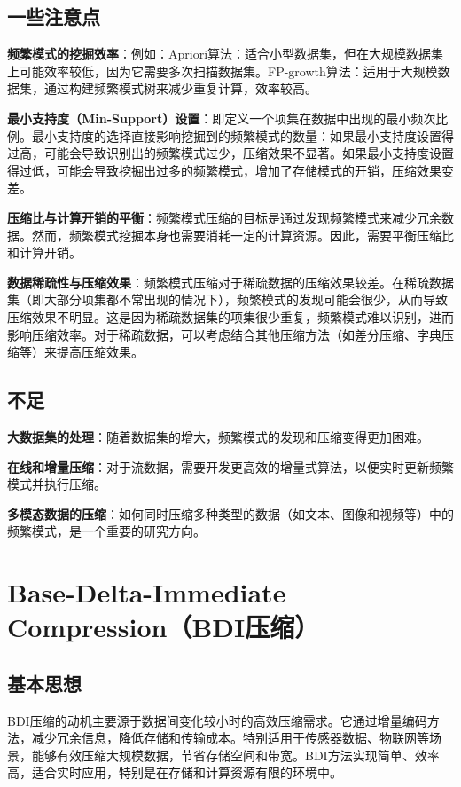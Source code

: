 \documentclass[12pt]{article}
\begin{document}
\subsection{一些注意点}
\textbf{频繁模式的挖掘效率}：例如：Apriori算法：适合小型数据集，但在大规模数据集上可能效率较低，因为它需要多次扫描数据集。FP-growth算法：适用于大规模数据集，通过构建频繁模式树来减少重复计算，效率较高。

\textbf{最小支持度（Min-Support）设置}：即定义一个项集在数据中出现的最小频次比例。最小支持度的选择直接影响挖掘到的频繁模式的数量：如果最小支持度设置得过高，可能会导致识别出的频繁模式过少，压缩效果不显著。如果最小支持度设置得过低，可能会导致挖掘出过多的频繁模式，增加了存储模式的开销，压缩效果变差。

\textbf{压缩比与计算开销的平衡}：频繁模式压缩的目标是通过发现频繁模式来减少冗余数据。然而，频繁模式挖掘本身也需要消耗一定的计算资源。因此，需要平衡压缩比和计算开销。

\textbf{数据稀疏性与压缩效果}：频繁模式压缩对于稀疏数据的压缩效果较差。在稀疏数据集（即大部分项集都不常出现的情况下），频繁模式的发现可能会很少，从而导致压缩效果不明显。这是因为稀疏数据集的项集很少重复，频繁模式难以识别，进而影响压缩效率。对于稀疏数据，可以考虑结合其他压缩方法（如差分压缩、字典压缩等）来提高压缩效果。

\subsection{不足}
\textbf{大数据集的处理}：随着数据集的增大，频繁模式的发现和压缩变得更加困难。

\textbf{在线和增量压缩}：对于流数据，需要开发更高效的增量式算法，以便实时更新频繁模式并执行压缩。

\textbf{多模态数据的压缩}：如何同时压缩多种类型的数据（如文本、图像和视频等）中的频繁模式，是一个重要的研究方向。


\section{Base-Delta-Immediate Compression（BDI压缩）}

\subsection{基本思想}

BDI压缩的动机主要源于数据间变化较小时的高效压缩需求。它通过增量编码方法，减少冗余信息，降低存储和传输成本。特别适用于传感器数据、物联网等场景，能够有效压缩大规模数据，节省存储空间和带宽。BDI方法实现简单、效率高，适合实时应用，特别是在存储和计算资源有限的环境中。
\end{document}
